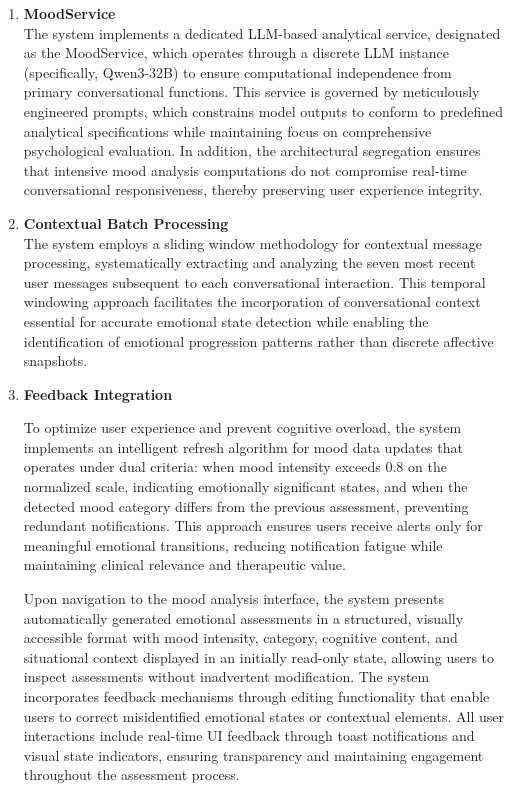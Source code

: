 \begin{enumerate}
\item \textbf{MoodService }\\
The system implements a dedicated LLM-based analytical service, designated as the MoodService, which operates through a discrete LLM instance (specifically, Qwen3-32B) to ensure computational independence from primary conversational functions. This service is governed by meticulously engineered prompts, which constrains model outputs to conform to predefined analytical specifications while maintaining focus on comprehensive psychological evaluation. In addition, the architectural segregation  ensures that intensive mood analysis computations do not compromise real-time conversational responsiveness, thereby preserving user experience integrity.

    \item \textbf{Contextual Batch Processing}\\
The system employs a sliding window methodology for contextual message processing, systematically extracting and analyzing the seven most recent user messages subsequent to each conversational interaction. This temporal windowing approach facilitates the incorporation of conversational context essential for accurate emotional state detection while enabling the identification of emotional progression patterns rather than discrete affective snapshots. 

\item \textbf{Feedback Integration}

To optimize user experience and prevent cognitive overload, the system implements an intelligent refresh algorithm for mood data updates that operates under dual criteria: when mood intensity exceeds 0.8 on the normalized scale, indicating emotionally significant states, and when the detected mood category differs from the previous assessment, preventing redundant notifications. This approach ensures users receive alerts only for meaningful emotional transitions, reducing notification fatigue while maintaining clinical relevance and therapeutic value.

Upon navigation to the mood analysis interface, the system presents automatically generated emotional assessments in a structured, visually accessible format with mood intensity, category, cognitive content, and situational context displayed in an initially read-only state, allowing users to inspect assessments without inadvertent modification. The system incorporates feedback mechanisms through editing functionality that enable users to correct misidentified emotional states or contextual elements. All user interactions include real-time UI feedback through toast notifications and visual state indicators, ensuring transparency and maintaining engagement throughout the assessment process.


\end{enumerate}
